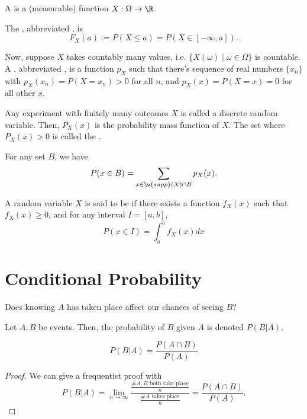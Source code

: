 \documentclass[11pt]{article}
\begin{document}
\begin{defn}
    A  is a (measurable) function $X : \Omega \to \R$.
\end{defn}

\begin{defn}
    The , abbreviated , is
    $$F_X(a) := P(X \leq a)=P(X \in [-\infty, a]).$$

Now, suppose $X$ takes countably many values, i.e. $\{ X(\omega) \mid \omega \in \Omega\}$ is countable. A , abbreviated , is a function $p_X$ such that there's sequence of real numbers $\{x_n\}$ with $p_X(x_n)=P(X = x_n)>0$ for all $n$, and $p_X(x)=P(X=x)=0$ for all other $x$.
\end{defn}

\begin{ex}
    Any experiment with finitely many outcomes $X$ is called a discrete random variable. Then, $P_X(x)$ is the probability mass function of $X$. The set where $P_X(x)>0$ is called the .

    For any set $B$, we have
    $$P(x\in B) = \sum_{x \in \w{supp}(X)\cap B}p_X(x).$$
\end{ex}

\begin{defn}
    A random variable $X$ is said to be  if there exists a function $f_X(x)$ such that $f_X(x) \geq 0$, and for any interval $I=[a,b]$,
    $$P(x \in I) = \int_a^bf_X(x)dx$$
\end{defn}

\section{Conditional Probability}

\begin{que}
    Does knowing $A$ has taken place affect our chances of seeing $B$?
\end{que}

\begin{defn}
    Let $A,B$ be events. Then, the probability of $B$ given $A$ is denoted $P(B|A)$.
\end{defn}

\begin{thm}[][label=thm:cond_intersect]
    $$P(B|A) = \frac{P(A\cap B)}{P(A)}$$
\end{thm}

\begin{proof}
    We can give a frequentist proof with
    $$P(B|A) = \lim_{n \to \infty}\frac{\frac{\#A,B \text{ both take place}}{n}}{\frac{\#A \text{ takes place}}{n}}=\frac{P(A\cap B)}{P(A)}.$$
\end{proof}
\end{document}
